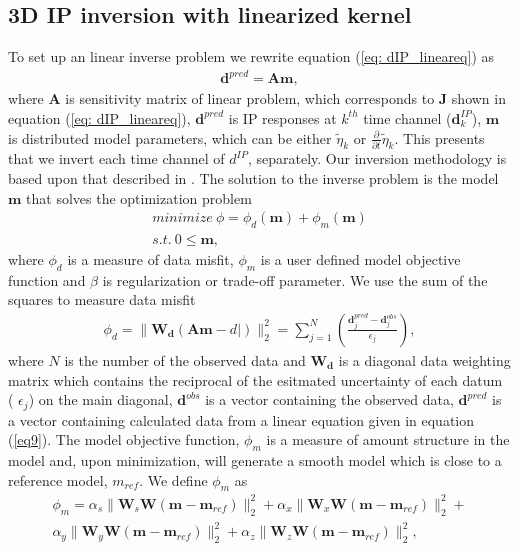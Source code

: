 \documentclass[a4paper, 11pt]{article}
\newcommand{\peta}{\tilde{\eta}}
\newcommand{\dip}{d^{IP}}
\begin{document}
\subsection{3D IP inversion with linearized kernel}
To set up an linear inverse problem we rewrite equation (\ref{eq: dIP_lineareq}) as
\begin{eqnarray}
  \mathbf{d}^{pred} = \mathbf{A}\mathbf{m},
  \label{eq9}
\end{eqnarray}
where $\mathbf{A}$ is sensitivity matrix of linear problem, which corresponds to $\mathbf{J}$ shown in equation (\ref{eq: dIP_lineareq}), $\mathbf{d}^{pred}$ is IP responses at $k^{th}$ time channel ($\mathbf{d}^{IP}_k$), $\mathbf{m}$ is distributed model parameters, which can be either $\peta_{k}$ or $\frac{\partial}{\partial t}\peta_{k}$. This presents that we invert each time channel of $\dip$, separately. Our inversion methodology is based upon that described in \cite{doug1994}. The solution to the inverse problem is the model $\mathbf{m}$ that solves the optimization problem
\begin{eqnarray}
  minimize \ \phi =  \phi_d(\mathbf{m}) + \phi_m(\mathbf{m})\nonumber \\
  s.t. \ 0 \le \mathbf{m},
  \label{eq10}
\end{eqnarray}
where $\phi_d$ is a measure of data misfit, $\phi_m$ is a user defined model objective function and $\beta$ is regularization or trade-off parameter. We use the sum of the squares to measure data misfit
\begin{eqnarray}
  \phi_d = \| \mathbf{W_d}(\mathbf{A}\mathbf{m}-d|)\|^2_2 =
  \sum^N_{j=1}(\frac{\mathbf{d}^{pred}_j-\mathbf{d}^{obs}_j}{\epsilon_j}),
  \label{eq11}
\end{eqnarray}
where $N$ is the number of the observed data and $\mathbf{W_d}$ is a diagonal data weighting matrix which contains the reciprocal of the esitmated uncertainty of each datum (
$\epsilon_j$) on the main diagonal,  $\mathbf{d}^{obs}$ is a vector containing the observed data, $\mathbf{d}^{pred}$ is a vector containing calculated data from a linear equation given in equation (\ref{eq9}).
The model objective function, $\phi_m$ is a measure of amount structure in the model and, upon minimization, will generate a smooth model which is close to a reference model, $m_{ref}$. We define $\phi_m$ as
\begin{eqnarray}
  \phi_m = \alpha_s\| \mathbf{W}_s\mathbf{W}(\mathbf{m}-\mathbf{m}_{ref})\|^2_2+
       \alpha_x\| \mathbf{W}_x\mathbf{W}(\mathbf{m}-\mathbf{m}_{ref})\|^2_2+ \nonumber \\
       \alpha_y\| \mathbf{W}_y\mathbf{W}(\mathbf{m}-\mathbf{m}_{ref})\|^2_2+
       \alpha_z\| \mathbf{W}_z\mathbf{W}(\mathbf{m}-\mathbf{m}_{ref})\|^2_2,
  \label{eq12}
\end{eqnarray}
\end{document}
